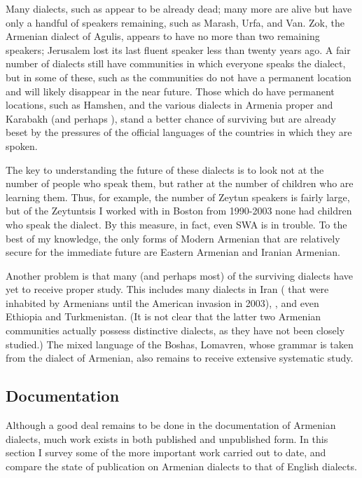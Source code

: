 Many dialects, such as  appear to be already dead; many more are alive but have only a handful of speakers remaining, such as Marash, Urfa, and Van. Zok, the Armenian dialect of Agulis, appears to have no more than two remaining speakers; Jerusalem lost its last fluent speaker less than twenty years ago. A fair number of dialects still have communities in which everyone speaks the dialect, but in some of these, such as  the communities do not have a permanent location and will likely disappear in the near future. Those which do have permanent locations, such as Hamshen,  and the various dialects in Armenia proper and Karabakh (and perhaps ), stand a better chance of surviving but are already beset by the pressures of the official languages of the countries in which they are spoken.

The key to understanding the future of these dialects is to look not at the number of people who speak them, but rather at the number of children who are learning them. Thus, for example, the number of Zeytun speakers is fairly large, but of the Zeytuntsis I worked with in Boston from 1990-2003 none had children who speak the dialect. By this measure, in fact, even SWA is in trouble. To the best of my knowledge, the only forms of Modern Armenian that are relatively secure for the immediate future are Eastern Armenian and Iranian Armenian.

Another problem is that many (and perhaps most) of the surviving dialects have yet to receive proper study. This includes many dialects in Iran ( that were inhabited by Armenians until the American invasion in 2003), , and even Ethiopia and Turkmenistan. (It is not clear that the latter two Armenian communities actually possess distinctive dialects, as they have not been closely studied.) The mixed language of the Boshas, Lomavren, whose grammar is taken from the  dialect of Armenian, also remains to receive extensive systematic study.

\subsection{Documentation}
Although a good deal remains to be done in the documentation of Armenian dialects, much work exists in both published and unpublished form. In this section I survey some of the more important work carried out to date, and compare the state of publication on Armenian dialects to that of English dialects.


